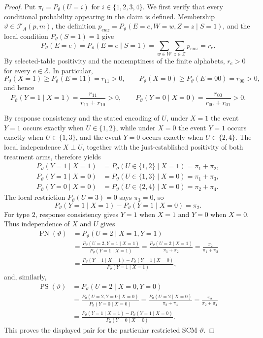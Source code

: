 \documentclass{article}
\begin{document}
\begin{proof}
Put \(\pi_i=P_{\vartheta}(U=i)\) for \(i\in\{1,2,3,4\}\).  We first verify that every conditional probability appearing in the claim is defined.  Membership \(\vartheta\in\mathcal F_A(p,m)\), the definition \(p_{ewz}=P_{\vartheta}(E=e,W=w,Z=z\mid S=1)\), and the local condition \(P_{\vartheta}(S=1)=1\) give
\[
 P_{\vartheta}(E=e)
 =P_{\vartheta}(E=e\mid S=1)
 =\sum_{w\in\mathcal W}\sum_{z\in\mathcal Z}p_{ewz}
 =r_e.
\]
By selected-table positivity and the nonemptiness of the finite alphabets, \(r_e>0\) for every \(e\in\mathcal E\).  In particular,
\[
 P_{\vartheta}(X=1)\ge P_{\vartheta}(E=11)=r_{11}>0,
 \qquad
 P_{\vartheta}(X=0)\ge P_{\vartheta}(E=00)=r_{00}>0,
\]
and hence
\[
 P_{\vartheta}(Y=1\mid X=1)
 =\frac{r_{11}}{r_{11}+r_{10}}>0,
 \qquad
 P_{\vartheta}(Y=0\mid X=0)
 =\frac{r_{00}}{r_{00}+r_{01}}>0.
\]

By response consistency and the stated encoding of \(U\), under \(X=1\) the event \(Y=1\) occurs exactly when \(U\in\{1,2\}\), while under \(X=0\) the event \(Y=1\) occurs exactly when \(U\in\{1,3\}\), and the event \(Y=0\) occurs exactly when \(U\in\{2,4\}\).  The local independence \(X\perp U\), together with the just-established positivity of both treatment arms, therefore yields
\[
\begin{aligned}
 P_{\vartheta}(Y=1\mid X=1)
 &=P_{\vartheta}(U\in\{1,2\}\mid X=1)=\pi_1+\pi_2,\\
 P_{\vartheta}(Y=1\mid X=0)
 &=P_{\vartheta}(U\in\{1,3\}\mid X=0)=\pi_1+\pi_3,\\
 P_{\vartheta}(Y=0\mid X=0)
 &=P_{\vartheta}(U\in\{2,4\}\mid X=0)=\pi_2+\pi_4.
\end{aligned}
\]
The local restriction \(P_{\vartheta}(U=3)=0\) says \(\pi_3=0\), so
\[
 P_{\vartheta}(Y=1\mid X=1)-P_{\vartheta}(Y=1\mid X=0)=\pi_2.
\]
For type \(2\), response consistency gives \(Y=1\) when \(X=1\) and \(Y=0\) when \(X=0\).  Thus independence of \(X\) and \(U\) gives
\[
\begin{aligned}
 \operatorname{PN}(\vartheta)
 &=P_{\vartheta}(U=2\mid X=1,Y=1)\\
 &=\frac{P_{\vartheta}(U=2,Y=1\mid X=1)}{P_{\vartheta}(Y=1\mid X=1)}
 =\frac{P_{\vartheta}(U=2\mid X=1)}{\pi_1+\pi_2}
 =\frac{\pi_2}{\pi_1+\pi_2}\\
 &=\frac{P_{\vartheta}(Y=1\mid X=1)-P_{\vartheta}(Y=1\mid X=0)}{P_{\vartheta}(Y=1\mid X=1)},
\end{aligned}
\]
and, similarly,
\[
\begin{aligned}
 \operatorname{PS}(\vartheta)
 &=P_{\vartheta}(U=2\mid X=0,Y=0)\\
 &=\frac{P_{\vartheta}(U=2,Y=0\mid X=0)}{P_{\vartheta}(Y=0\mid X=0)}
 =\frac{P_{\vartheta}(U=2\mid X=0)}{\pi_2+\pi_4}
 =\frac{\pi_2}{\pi_2+\pi_4}\\
 &=\frac{P_{\vartheta}(Y=1\mid X=1)-P_{\vartheta}(Y=1\mid X=0)}{P_{\vartheta}(Y=0\mid X=0)}.
\end{aligned}
\]
This proves the displayed pair for the particular restricted SCM \(\vartheta\).


\end{proof}
\end{document}

